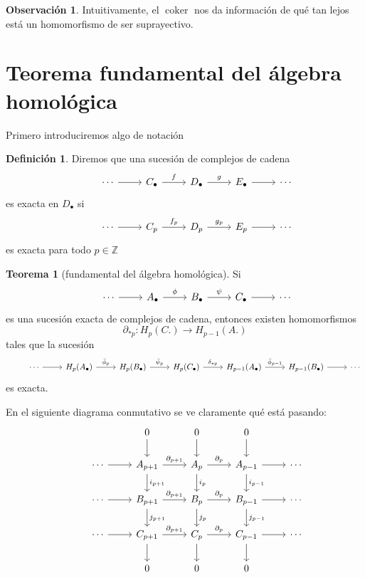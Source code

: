 \documentclass[spanish]{book}
\theoremstyle{definition}
\newtheorem*{defn}{Definición}
\newtheorem*{obs}{Observación}
\newtheorem*{teo}{Teorema}
\newcommand{\Z}{\mathbb{Z}}
\DeclareMathOperator{\coker}{coker}
\begin{document}
	\begin{obs}
		Intuitivamente, el $\coker$ nos da información de qué tan lejos está un homomorfismo de ser suprayectivo.
	\end{obs}
\section{Teorema fundamental del álgebra homológica}
	Primero introduciremos algo de notación
	\begin{defn}
		Diremos que una sucesión de complejos de cadena
		\[\begin{tikzcd}
			&\cdots\arrow{r}&C_\bullet\arrow{r}{f}&D_\bullet\arrow{r}{g}&E_\bullet\arrow{r}&\cdots
		\end{tikzcd}\]
		es exacta en $D_\bullet$ si 
		\[\begin{tikzcd}
			&\cdots\arrow{r}&C_p\arrow{r}{f_p}&D_p\arrow{r}{g_p}&E_p\arrow{r}&\cdots
		\end{tikzcd}\]
		es exacta para todo $p\in\Z$
	\end{defn}
	\begin{teo}[fundamental del álgebra homológica]
		Si 
		\[\begin{tikzcd}
			&\cdots\arrow{r}&A_\bullet\arrow{r}{\phi}&B_\bullet\arrow{r}{\psi}&C_\bullet\arrow{r}&\cdots
		\end{tikzcd}\]
		es una sucesión exacta de complejos de cadena, entonces existen homomorfismos $$\partial_{*p}:H_p(C.)\to H_{p-1}(A.)$$
		tales que la sucesión
		\[\begin{tikzcd}
			&\cdots\arrow{r}&H_p(A_\bullet)\arrow{r}{\bar\phi_p}&H_p(B_\bullet)\arrow{r}{\bar\psi_p}&H_p(C_\bullet)\arrow{r}{\delta_{*p}}&H_{p-1}(A_\bullet)\arrow{r}{\bar\phi_{p-1}}&H_{p-1}(B_\bullet)\arrow{r}&\cdots
		\end{tikzcd}\]
		es exacta.
	\end{teo}
	En el siguiente diagrama conmutativo se ve claramente qué está pasando:
	\[
	\begin{tikzcd}
		& & 0 \arrow{d} & 0 \arrow{d} & 0 \arrow{d} & \\
		& \cdots \arrow{r} & A_{p+1} \arrow{r}{\partial_{p+1}} \arrow{d}{i_{p+1}} & A_p \arrow{r}{\partial_p} \arrow{d}{i_p} & A_{p-1} \arrow{r} \arrow{d}{i_{p-1}} & \cdots \\
		& \cdots \arrow{r} & B_{p+1} \arrow{r}{\partial_{p+1}} \arrow{d}{j_{p+1}} & B_p \arrow{r}{\partial_p} \arrow{d}{j_p} & B_{p-1} \arrow{r} \arrow{d}{j_{p-1}} & \cdots \\
		& \cdots \arrow{r} & C_{p+1} \arrow{r}{\partial_{p+1}} \arrow{d} & C_p \arrow{r}{\partial_p} \arrow{d} & C_{p-1} \arrow{r} \arrow{d} & \cdots \\
		& & 0 & 0 & 0 & \\
	\end{tikzcd}
	\]
\end{document}
